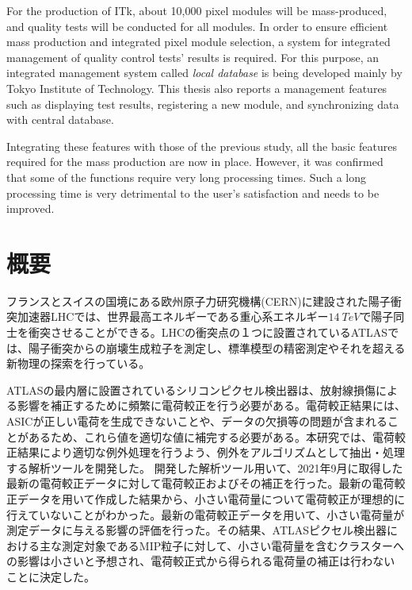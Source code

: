 For the production of ITk, about 10,000 pixel modules will be mass-produced, and quality tests will be conducted for all modules.
In order to ensure efficient mass production and integrated pixel module selection, a system for integrated management of quality control tests' results is required.
For this purpose, an integrated management system called \textit{local database} is being developed mainly by Tokyo Institute of Technology.
This thesis also reports a management features such as displaying test results, registering a new module, and synchronizing data with central database.

Integrating these features with those of the previous study, all the basic features required for the mass production are now in place.
However, it was confirmed that some of the functions require very long processing times.
Such a long processing time is very detrimental to the user's satisfaction and needs to be improved.

\newpage

\chapter*{概要}

フランスとスイスの国境にある欧州原子力研究機構(CERN)に建設された陽子衝突加速器LHCでは、世界最高エネルギーである重心系エネルギー$14\ \si{TeV}$で陽子同士を衝突させることができる。LHCの衝突点の１つに設置されているATLASでは、陽子衝突からの崩壊生成粒子を測定し、標準模型の精密測定やそれを超える新物理の探索を行っている。

ATLASの最内層に設置されているシリコンピクセル検出器は、放射線損傷による影響を補正するために頻繁に電荷較正を行う必要がある。電荷較正結果には、ASICが正しい電荷を生成できないことや、データの欠損等の問題が含まれることがあるため、これら値を適切な値に補完する必要がある。本研究では、電荷較正結果により適切な例外処理を行うよう、例外をアルゴリズムとして抽出・処理する解析ツールを開発した。
開発した解析ツール用いて、2021年9月に取得した最新の電荷較正データに対して電荷較正およびその補正を行った。最新の電荷較正データを用いて作成した結果から、小さい電荷量について電荷較正が理想的に行えていないことがわかった。最新の電荷較正データを用いて、小さい電荷量が測定データに与える影響の評価を行った。その結果、ATLASピクセル検出器における主な測定対象であるMIP粒子に対して、小さい電荷量を含むクラスターへの影響は小さいと予想され、電荷較正式から得られる電荷量の補正は行わないことに決定した。

